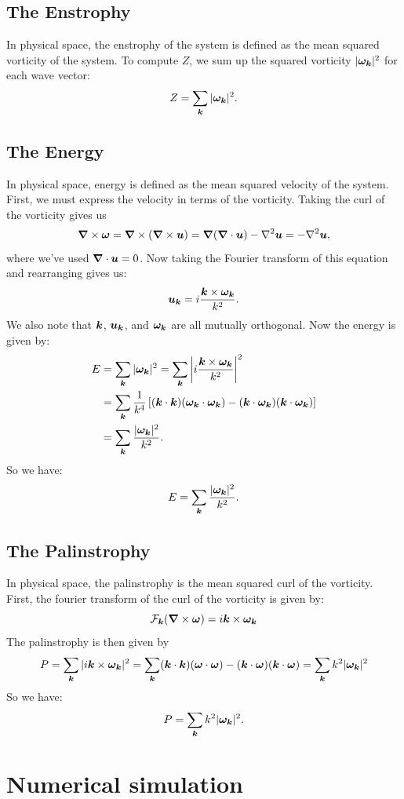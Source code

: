 \documentclass[12pt]{article}
\def\v{\bm}
\def\vw{{\v\w}}
\begin{document}
\subsection{The Enstrophy}
In physical space, the enstrophy of the system is defined as the mean squared vorticity of the system. To compute $Z$, we sum up the squared vorticity $|\vw_\vk|^2$ for each wave vector:
$$ Z = \sum_{\vk} |\vw_\vk|^2.$$
\subsection{The Energy}
In physical space, energy is defined as the mean squared velocity of the system. First, we must express the velocity in terms of the vorticity. Taking the curl of the vorticity gives us
$$\grad \times \vw = \grad \times(\grad \times \vu) = \grad(\grad\cdot \vu)- {\nabla}^2 \vu = - {\nabla}^2 \vu,$$
where we've used $\grad\cdot \vu = 0$. Now taking the Fourier transform of this equation and rearranging gives us:
$$\vu_\vk = i \frac{\vk\times \vw_\vk}{k^2}. $$
We also note that $\vk$, $\vu_\vk$, and $\vw_\vk$ are all mutually orthogonal. Now the energy is given by:
\begin{align}
E &= \sum_{\vk} |\vw_\vk|^2 = \sum_{\vk} \left|i \frac{\vk\times \vw_\vk}{k^2} \right|^2\\
& =\sum_{\vk}\frac{1}{k^4} \left[(\vk\cdot \vk ) (\vw_\vk\cdot \vw_\vk) -  (\vk\cdot \vw_\vk ) (\vk\cdot \vw_\vk)  \right] \\
& = \sum_{\vk}\frac{|\vw_\vk|^2}{k^2}.
\end{align}
So we have:
$$E = \sum_{\vk}\frac{|\vw_\vk|^2}{k^2}.$$
\subsection{The Palinstrophy}
In physical space, the palinstrophy is the mean squared curl of the vorticity. First, the fourier transform of the curl of the vorticity is given by:
$$\cal{F}_{\vk}(\grad\times \vw) = i\vk\times \vw_\vk$$
The palinstrophy is then given by
$$P = \sum_{\vk} |i\vk\times \vw_\vk|^2 = \sum_{\vk} (\vk\cdot \vk ) (\vw\cdot \vw) -  (\vk\cdot \vw ) (\vk\cdot \vw)  = \sum_{\vk} k^2|\vw_\vk|^2 $$
So we have: 
$$P = \sum_{\vk} k^2|\vw_\vk|^2 .$$
\section{Numerical simulation}
\end{document}
